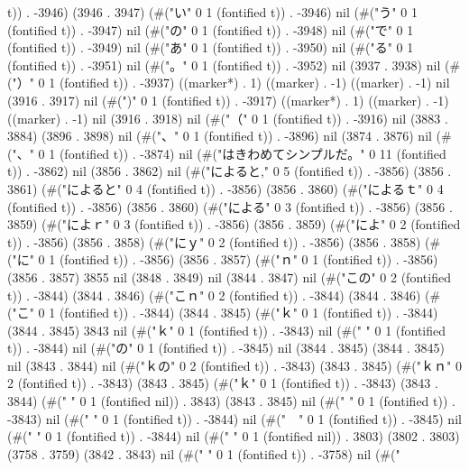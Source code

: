 t)) . -3946) (3946 . 3947) (#("い" 0 1 (fontified t)) . -3946) nil (#("う" 0 1 (fontified t)) . -3947) nil (#("の" 0 1 (fontified t)) . -3948) nil (#("で" 0 1 (fontified t)) . -3949) nil (#("あ" 0 1 (fontified t)) . -3950) nil (#("る" 0 1 (fontified t)) . -3951) nil (#("。" 0 1 (fontified t)) . -3952) nil (3937 . 3938) nil (#("）" 0 1 (fontified t)) . -3937) ((marker*) . 1) ((marker) . -1) ((marker) . -1) nil (3916 . 3917) nil (#(")" 0 1 (fontified t)) . -3917) ((marker*) . 1) ((marker) . -1) ((marker) . -1) nil (3916 . 3918) nil (#("（" 0 1 (fontified t)) . -3916) nil (3883 . 3884) (3896 . 3898) nil (#("、" 0 1 (fontified t)) . -3896) nil (3874 . 3876) nil (#("、" 0 1 (fontified t)) . -3874) nil (#("はきわめてシンプルだ。" 0 11 (fontified t)) . -3862) nil (3856 . 3862) nil (#("によると," 0 5 (fontified t)) . -3856) (3856 . 3861) (#("によると" 0 4 (fontified t)) . -3856) (3856 . 3860) (#("によるｔ" 0 4 (fontified t)) . -3856) (3856 . 3860) (#("による" 0 3 (fontified t)) . -3856) (3856 . 3859) (#("によｒ" 0 3 (fontified t)) . -3856) (3856 . 3859) (#("によ" 0 2 (fontified t)) . -3856) (3856 . 3858) (#("にｙ" 0 2 (fontified t)) . -3856) (3856 . 3858) (#("に" 0 1 (fontified t)) . -3856) (3856 . 3857) (#("ｎ" 0 1 (fontified t)) . -3856) (3856 . 3857) 3855 nil (3848 . 3849) nil (3844 . 3847) nil (#("この" 0 2 (fontified t)) . -3844) (3844 . 3846) (#("こｎ" 0 2 (fontified t)) . -3844) (3844 . 3846) (#("こ" 0 1 (fontified t)) . -3844) (3844 . 3845) (#("ｋ" 0 1 (fontified t)) . -3844) (3844 . 3845) 3843 nil (#("ｋ" 0 1 (fontified t)) . -3843) nil (#("
" 0 1 (fontified t)) . -3844) nil (#("の" 0 1 (fontified t)) . -3845) nil (3844 . 3845) (3844 . 3845) nil (3843 . 3844) nil (#("ｋの" 0 2 (fontified t)) . -3843) (3843 . 3845) (#("ｋｎ" 0 2 (fontified t)) . -3843) (3843 . 3845) (#("ｋ" 0 1 (fontified t)) . -3843) (3843 . 3844) (#(" " 0 1 (fontified nil)) . 3843) (3843 . 3845) nil (#("
" 0 1 (fontified t)) . -3843) nil (#("
" 0 1 (fontified t)) . -3844) nil (#("　" 0 1 (fontified t)) . -3845) nil (#("
" 0 1 (fontified t)) . -3844) nil (#(" " 0 1 (fontified nil)) . 3803) (3802 . 3803) (3758 . 3759) (3842 . 3843) nil (#("
" 0 1 (fontified t)) . -3758) nil (#("
